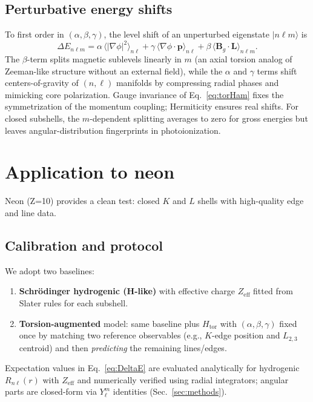\documentclass[12pt]{article}
\begin{document}
\subsection{Perturbative energy shifts}
To first order in $(\alpha,\beta,\gamma)$, the level shift of an unperturbed eigenstate $\lvert n\ell m\rangle$ is
\begin{equation}
\Delta E_{n\ell m} = \alpha\,\big\langle |\nabla \phi|^2 \big\rangle_{n\ell}
+ \gamma\,\big\langle \nabla \phi \cdot \bm{p} \big\rangle_{n\ell}
+ \beta\,\big\langle \bm{B}_g\cdot \bm{L} \big\rangle_{n\ell m}.
\label{eq:DeltaE}
\end{equation}
The $\beta$-term splits magnetic sublevels linearly in $m$ (an axial torsion analog of Zeeman-like structure without an external field), while the $\alpha$ and $\gamma$ terms shift centers-of-gravity of $(n,\ell)$ manifolds by compressing radial phases and mimicking core polarization. Gauge invariance of Eq.~\eqref{eq:torHam} fixes the symmetrization of the momentum coupling; Hermiticity ensures real shifts. For closed subshells, the $m$-dependent splitting averages to zero for gross energies but leaves angular-distribution fingerprints in photoionization.

\section{Application to neon}
Neon (Z=10) provides a clean test: closed $K$ and $L$ shells with high-quality edge and line data.\cite{NISTXray,Chantler,KrauseOliver}

\subsection{Calibration and protocol}
We adopt two baselines:
\begin{enumerate}
\item \textbf{Schrödinger hydrogenic (H-like)} with effective charge $Z_{\mathrm{eff}}$ fitted from Slater rules for each subshell.\cite{Slater}
\item \textbf{Torsion-augmented} model: same baseline plus $H_{\mathrm{tor}}$ with $(\alpha,\beta,\gamma)$ fixed once by matching two reference observables (e.g., $K$-edge position and $L_{2,3}$ centroid) and then \emph{predicting} the remaining lines/edges.
\end{enumerate}
Expectation values in Eq.~\eqref{eq:DeltaE} are evaluated analytically for hydrogenic $R_{n\ell}(r)$ with $Z_{\mathrm{eff}}$ and numerically verified using radial integrators; angular parts are closed-form via $Y_\ell^m$ identities (Sec.~\ref{sec:methods}).
\end{document}
